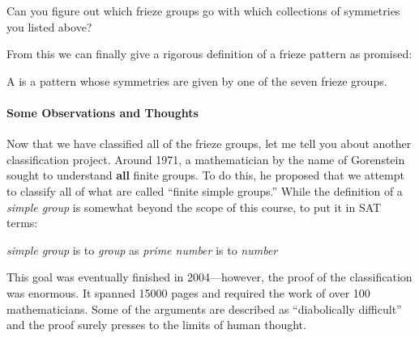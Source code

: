 \documentclass[nooutcomes,noauthor]{ximera}
\begin{document}
\begin{problem} 
Can you figure out which frieze groups go with which collections of
symmetries you listed above?
\end{problem}



From this we can finally give a rigorous definition of a frieze pattern
as promised:

\begin{definition}
A  is a pattern whose symmetries are given by
one of the seven frieze groups.
\end{definition}




\paragraph{Some Observations and Thoughts}


Now that we have classified all of the frieze groups, let me tell you about
another classification project. Around 1971, a mathematician by the
name of Gorenstein sought to understand \textbf{all} finite
groups. To do this, he proposed that we attempt to classify all of
what are called ``finite simple groups.'' While the definition of a
\textit{simple group} is somewhat beyond the scope of this course, to
put it in SAT terms:
\begin{center}
\textit{simple group} is to \textit{group} \qquad as \qquad \textit{prime number} is to \textit{number}
\end{center}
This goal was eventually finished in 2004---however, the proof of the
classification was enormous. It spanned 15000 pages and required the
work of over 100 mathematicians. Some of the arguments are described
as ``diabolically difficult'' and the proof surely presses to the
limits of human thought.
\end{document}

